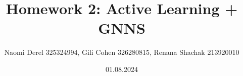 \documentclass[12pt]{article}
\begin{document}
\title{Homework 2: Active Learning + GNNS}
\author{Naomi Derel 325324994, Gili Cohen 326280815, Renana Shachak 213920010}
\date{01.08.2024}
\maketitle


\end{document}
